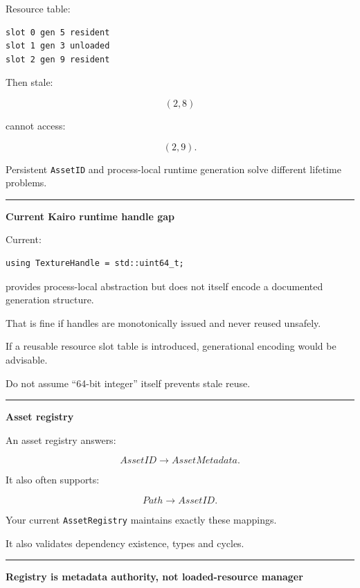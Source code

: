 Resource table:

\begin{verbatim}
slot 0 gen 5 resident
slot 1 gen 3 unloaded
slot 2 gen 9 resident
\end{verbatim}

Then stale:

\[
(2,8)
\]

cannot access:

\[
(2,9).
\]

Persistent \texttt{AssetID} and process-local runtime generation solve different lifetime problems.

\begin{center}\rule{0.5\linewidth}{0.5pt}\end{center}

\textbf{Current Kairo runtime handle gap}

Current:

\begin{verbatim}
using TextureHandle = std::uint64_t;
\end{verbatim}

provides process-local abstraction but does not itself encode a documented generation structure.

That is fine if handles are monotonically issued and never reused unsafely.

If a reusable resource slot table is introduced, generational encoding would be advisable.

Do not assume ``64-bit integer'' itself prevents stale reuse.

\begin{center}\rule{0.5\linewidth}{0.5pt}\end{center}

\textbf{Asset registry}

An asset registry answers:

\[
AssetID\rightarrow AssetMetadata.
\]

It also often supports:

\[
Path\rightarrow AssetID.
\]

Your current \texttt{AssetRegistry} maintains exactly these mappings.

It also validates dependency existence, types and cycles.

\begin{center}\rule{0.5\linewidth}{0.5pt}\end{center}

\textbf{Registry is metadata authority, not loaded-resource manager}

